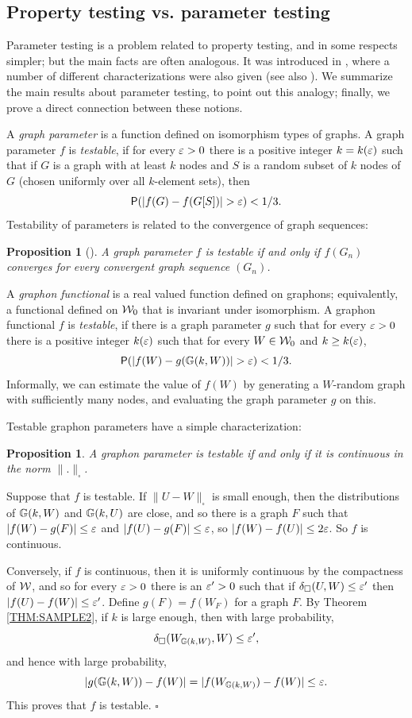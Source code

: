 \documentclass{article}
\newtheorem{prop}[theorem]{Proposition}
\newenvironment{proof}{\medskip\noindent{\bf Proof. }}{\hfill$\square$\medskip}
\begin{document}
\subsection{Property testing vs. parameter testing}

Parameter testing is a problem related to property testing, and in
some respects simpler; but the main facts are often analogous. It was
introduced in \cite{BCLSV1}, where a number of different
characterizations were also given (see also \cite{BCLSSV}). We
summarize the main results about parameter testing, to point out this
analogy; finally, we prove a direct connection between these notions.

A {\it graph parameter} is a function defined on isomorphism types
of graphs. A graph parameter $f$ is {\it testable}, if for every
$\varepsilon>0$ there is a positive integer $k=k(\varepsilon)$ such that if $G$
is a graph with at least $k$ nodes and $S$ is a random subset of
$k$ nodes of $G$ (chosen uniformly over all $k$-element sets),
then
\[
\Pr(|f(G)-f(G[S])|>\eps)<1/3.
\]
Testability of parameters is related to the convergence of graph
sequences:

\begin{prop}[\cite{BCLSV1}]\label{thm:TESTABLE-PAR}
A graph parameter $f$ is testable if and only if $f(G_n)$
converges for every convergent graph sequence $(G_n)$.
\end{prop}

A {\it graphon functional} is a real valued function defined on
graphons; equivalently, a functional defined on $\mathcal{W}_0$ that is
invariant under isomorphism. A graphon functional $f$ is {\it
testable}, if there is a graph parameter $g$ such that for every
$\varepsilon>0$ there is a positive integer $k(\varepsilon)$ such that for every
$W\in\mathcal{W}_0$ and $k\ge k(\varepsilon)$,
\[
\Pr(|f(W)-g(\Ge(k,W))|>\eps)<1/3.
\]
Informally, we can estimate the value of $f(W)$ by generating a
$W$-random graph with sufficiently many nodes, and evaluating the
graph parameter $g$ on this.

Testable graphon parameters have a simple characterization:

\begin{prop}\label{FUNCT-TEST}
A graphon parameter is testable if and only if it is continuous in
the norm $\|.\|_\square$.
\end{prop}

\begin{proof}
Suppose that $f$ is testable. If $\|U-W\|_\square$ is small enough,
then the distributions of ${\mathbb G}(k,W)$ and ${\mathbb G}(k,U)$ are close, and so
there is a graph $F$ such that $|f(W)-g(F)|\le\varepsilon$ and
$|f(U)-g(F)|\le\varepsilon$, so $|f(W)-f(U)|\le 2\varepsilon$. So $f$ is
continuous.

Conversely, if $f$ is continuous, then it is uniformly continuous by
the compactness of $\mathcal{W}$, and so for every $\varepsilon>0$ there is an
$\varepsilon'>0$ such that if $\delta_\square(U,W)\le\varepsilon'$ then
$|f(U)-f(W)|\le\varepsilon'$. Define $g(F)=f(W_F)$ for a graph $F$. By
Theorem \ref{THM:SAMPLE2}, if $k$ is large enough, then with large
probability,
\[
\delta_\square(W_{{\mathbb G}(k,W)},W)\le \varepsilon',
\]
and hence with large probability,
\[
|g({\mathbb G}(k,W))-f(W)| = |f(W_{{\mathbb G}(k,W)})-f(W)|\le \varepsilon.
\]
This proves that $f$ is testable.
\end{proof}
\end{document}
